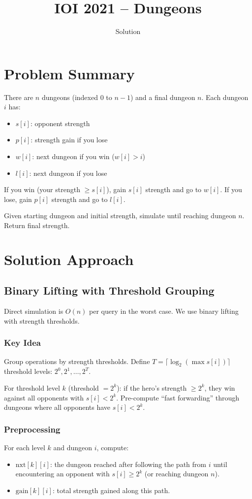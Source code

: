 \documentclass[11pt,a4paper]{article}
\title{IOI 2021 -- Dungeons}
\author{Solution}
\date{}
\begin{document}
\maketitle

\section{Problem Summary}
There are $n$ dungeons (indexed $0$ to $n-1$) and a final dungeon $n$. Each dungeon $i$ has:
\begin{itemize}
  \item $s[i]$: opponent strength
  \item $p[i]$: strength gain if you lose
  \item $w[i]$: next dungeon if you win ($w[i] > i$)
  \item $l[i]$: next dungeon if you lose
\end{itemize}

If you win (your strength $\ge s[i]$), gain $s[i]$ strength and go to $w[i]$. If you lose, gain $p[i]$ strength and go to $l[i]$.

Given starting dungeon and initial strength, simulate until reaching dungeon $n$. Return final strength.

\section{Solution Approach}

\subsection{Binary Lifting with Threshold Grouping}
Direct simulation is $O(n)$ per query in the worst case. We use binary lifting with strength thresholds.

\subsubsection{Key Idea}
Group operations by strength thresholds. Define $T = \lceil \log_2(\max s[i]) \rceil$ threshold levels: $2^0, 2^1, \ldots, 2^T$.

For threshold level $k$ (threshold $= 2^k$): if the hero's strength $\ge 2^k$, they win against all opponents with $s[i] < 2^k$. Pre-compute ``fast forwarding'' through dungeons where all opponents have $s[i] < 2^k$.

\subsubsection{Preprocessing}
For each level $k$ and dungeon $i$, compute:
\begin{itemize}
  \item $\text{nxt}[k][i]$: the dungeon reached after following the path from $i$ until encountering an opponent with $s[i] \ge 2^k$ (or reaching dungeon $n$).
  \item $\text{gain}[k][i]$: total strength gained along this path.
\end{itemize}
\end{document}
